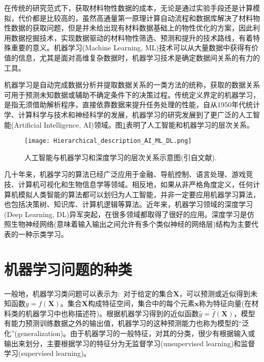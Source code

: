 \documentclass[10pt, oneside, a4paper]{article}      %
\newcommand{\upcite}[1]{\hspace{0ex}\textsuperscript{\cite{#1}}} %
\begin{document}
在传统的研究范式下，获取材料物性数据的成本，无论是通过实验手段还是计算模拟，代价都是比较高的，虽然高通量第一原理计算自动流程和数据库解决了材料物性数据的获取问题，但是并未给出现有材料数据基础上的物性优化的方案，因此利用数据挖掘技术，实现数据驱动的材料物性筛选、预测和提升的技术路线，有着特殊重要的意义。机器学习\textrm{(Machine Learning, ML)}技术可以从大量数据中获得有价值的信息，尤其是面对高维复杂数据时，机器学习技术是确定数据间关系的有力的工具。

机器学习是自动完成数据分析并提取数据关系的一类方法的统称，获取的数据关系可用于预测未知数据或辅助不确定条件下的决策过程\upcite{ML_2012}。传统定义界定的机器学习，是指无须借助解析程序，直接依靠数据来提升任务处理的性能\upcite{IBMJRD3-211_1959}，自从1950年代统计学、计算科学与技术和神经科学的发展，机器学习的研究发展到了更广泛的人工智能\textrm{(Artificial Intelligence, AI)}领域。图\ref{AI-ML}表明了人工智能和机器学习的层次关系。
\begin{figure}[h!]
\centering
\vspace*{-0.1in}
\texttt{[image: Hierarchical\_description\_AI\_ML\_DL.png]}
\caption{\textrm{人工智能与机器学习和深度学习的层次关系示意图(引自文献\cite{JPM2-032001_2019}).}}%
\label{AI-ML}
\end{figure}

几十年来，机器学习的算法已经广泛应用于金融、导航控制、语言处理、游戏竞技、计算机可视化和生物信息学等领域。相反地，如果从非严格角度定义，任何计算机模拟人类智能的算法都可以划归为人工智能，并非一定要应用机器学习算法，也包括决策树、知识库、计算机逻辑等算法。近年来，机器学习领域的深度学习\textrm{(Deep Learning, DL)}异军突起，在很多领域都取得了很好的应用\upcite{DL_2016}。深度学习是仿照生物神经网络(意味着输入输出之间允许有多个类似神经的网络层)结构为主要代表的一种示类学习。

\section{机器学习问题的种类}
一般地，机器学习类问题可以表示为:~对于给定的集合$\mathbf{X}$，可以预测或近似得到未知函数$y=f(\mathbf{X})$\upcite{ML-CI}。集合$\mathbf{X}$构成特征空间，集合中的每个元素$\mathbf{x}$称为特征向量(在材料类的机器学习中也称描述符)。根据机器学习得到的近似函数$\hat{y}=\hat{f}(\mathbf{X})$，模型有能力预测训练数据之外的输出值，机器学习的这种预测能力也称为模型的“泛化”\textrm{(generalization)}。由于机器学习的一般特征，对其的分类，很少有根据输入或输出来划分，主要根据学习的特征分为无监督学习\textrm{(unsupervised learning)}和监督学习\textrm{(supervised learning)}。
\end{document}
